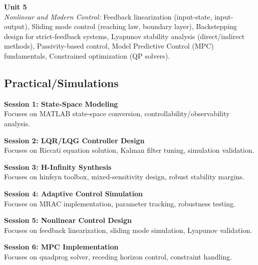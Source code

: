 \vspace{0.3cm}

\noindent\textbf{Unit 5} \\
\textit{Nonlinear and Modern Control:} Feedback linearization (input-state, input-output), Sliding mode control (reaching law, boundary layer), Backstepping design for strict-feedback systems, Lyapunov stability analysis (direct/indirect methods), Passivity-based control, Model Predictive Control (MPC) fundamentals, Constrained optimization (QP solvers).

\newpage

\subsection*{Practical/Simulations}
\noindent\textbf{Session 1: State-Space Modeling} \\
Focuses on MATLAB state-space conversion, controllability/observability analysis.

\vspace{0.2cm}

\noindent\textbf{Session 2: LQR/LQG Controller Design} \\
Focuses on Riccati equation solution, Kalman filter tuning, simulation validation.

\vspace{0.2cm}

\noindent\textbf{Session 3: H-Infinity Synthesis} \\
Focuses on hinfsyn toolbox, mixed-sensitivity design, robust stability margins.

\vspace{0.2cm}

\noindent\textbf{Session 4: Adaptive Control Simulation} \\
Focuses on MRAC implementation, parameter tracking, robustness testing.

\vspace{0.2cm}

\noindent\textbf{Session 5: Nonlinear Control Design} \\
Focuses on feedback linearization, sliding mode simulation, Lyapunov validation.

\vspace{0.2cm}

\noindent\textbf{Session 6: MPC Implementation} \\
Focuses on quadprog solver, receding horizon control, constraint handling.

\vspace{0.2cm}

